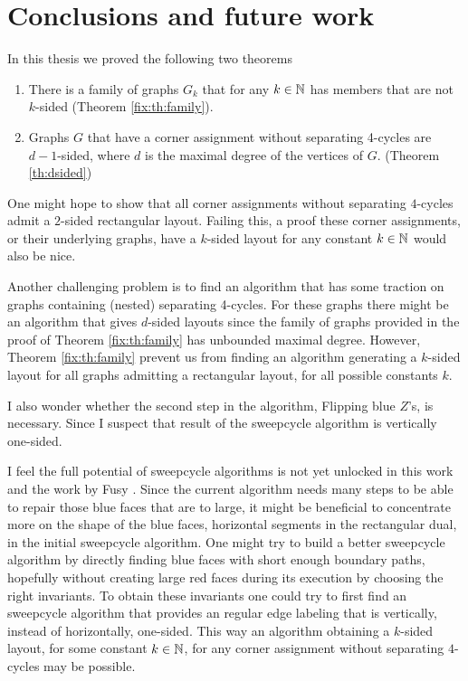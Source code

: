 
\thispagestyle{plain}
\section{Conclusions and future work}

In this thesis we proved the following two theorems

\begin{enumerate}
  \item There is a family of graphs $G_k$ that for any $k \in \mathbb{N}$ has members that are not $k$-sided (Theorem \ref{fix:th:family}).
  \item Graphs $G$ that have a corner assignment without separating 4-cycles are $d-1$-sided, where $d$ is the maximal degree of the vertices of $G$. (Theorem \ref{th:dsided})
\end{enumerate}

One might hope to show that all corner assignments without separating $4$-cycles admit a $2$-sided rectangular layout. Failing this, a proof these corner assignments, or their underlying graphs, have a $k$-sided layout for any constant $k\in \mathbb{N}$ would also be nice.

Another challenging problem is to find an algorithm that has some traction on graphs containing (nested) separating 4-cycles.
For these graphs there might be an algorithm that gives $d$-sided layouts since the family of graphs provided in the proof of Theorem \ref{fix:th:family} has unbounded maximal degree.
However, Theorem \ref{fix:th:family} prevent us from finding an algorithm generating a $k$-sided layout for all graphs admitting a rectangular layout, for all possible constants $k$.

I also wonder whether the second step in the algorithm, Flipping blue $Z$'s, is necessary.
Since I suspect that result of the sweepcycle algorithm is vertically one-sided.

I feel the full potential of sweepcycle algorithms is not yet unlocked in this work and the work by Fusy \cite{Fusy2006}.
Since the current algorithm needs many steps to be able to repair those blue faces that are to large, it might be beneficial to concentrate more on the shape of the blue faces, horizontal segments in the rectangular dual, in the initial sweepcycle algorithm.
One might try to build a better sweepcycle algorithm by directly finding blue faces with short enough boundary paths, hopefully without creating large red faces during its execution by choosing the right invariants.
To obtain these invariants one could try to first find an sweepcycle algorithm that provides an regular edge labeling that is vertically, instead of horizontally, one-sided.
This way an algorithm obtaining a $k$-sided layout, for some constant $k \in \mathbb{N}$, for any corner assignment without separating $4$-cycles may be possible.

